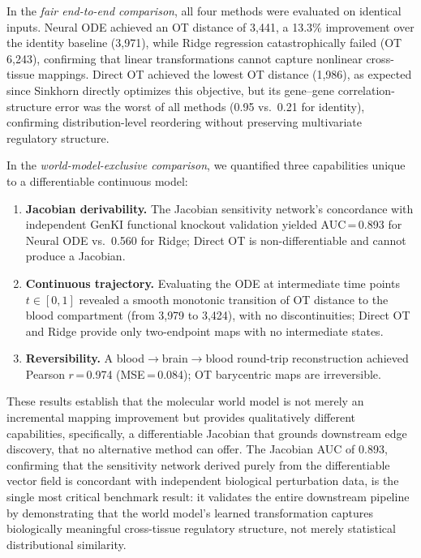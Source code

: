 \documentclass[12pt,a4paper]{article}
\begin{document}
In the \emph{fair end-to-end comparison}, all four methods were evaluated on identical inputs. Neural ODE achieved an OT distance of 3{,}441, a 13.3\% improvement over the identity baseline (3{,}971), while Ridge regression catastrophically failed (OT 6{,}243), confirming that linear transformations cannot capture nonlinear cross-tissue mappings. Direct OT achieved the lowest OT distance (1{,}986), as expected since Sinkhorn directly optimizes this objective, but its gene--gene correlation-structure error was the worst of all methods (0.95 vs.\ 0.21 for identity), confirming distribution-level reordering without preserving multivariate regulatory structure.

In the \emph{world-model-exclusive comparison}, we quantified three capabilities unique to a differentiable continuous model:
\begin{enumerate}
\item \textbf{Jacobian derivability.} The Jacobian sensitivity network's concordance with independent GenKI functional knockout validation yielded AUC\,=\,0.893 for Neural ODE vs.\ 0.560 for Ridge; Direct OT is non-differentiable and cannot produce a Jacobian.
\item \textbf{Continuous trajectory.} Evaluating the ODE at intermediate time points $t \in [0,1]$ revealed a smooth monotonic transition of OT distance to the blood compartment (from 3{,}979 to 3{,}424), with no discontinuities; Direct OT and Ridge provide only two-endpoint maps with no intermediate states.
\item \textbf{Reversibility.} A blood$\rightarrow$brain$\rightarrow$blood round-trip reconstruction achieved Pearson $r$\,=\,0.974 (MSE\,=\,0.084); OT barycentric maps are irreversible.
\end{enumerate}

These results establish that the molecular world model is not merely an incremental mapping improvement but provides qualitatively different capabilities, specifically, a differentiable Jacobian that grounds downstream edge discovery, that no alternative method can offer. The Jacobian AUC of 0.893, confirming that the sensitivity network derived purely from the differentiable vector field is concordant with independent biological perturbation data, is the single most critical benchmark result: it validates the entire downstream pipeline by demonstrating that the world model's learned transformation captures biologically meaningful cross-tissue regulatory structure, not merely statistical distributional similarity.
\end{document}
